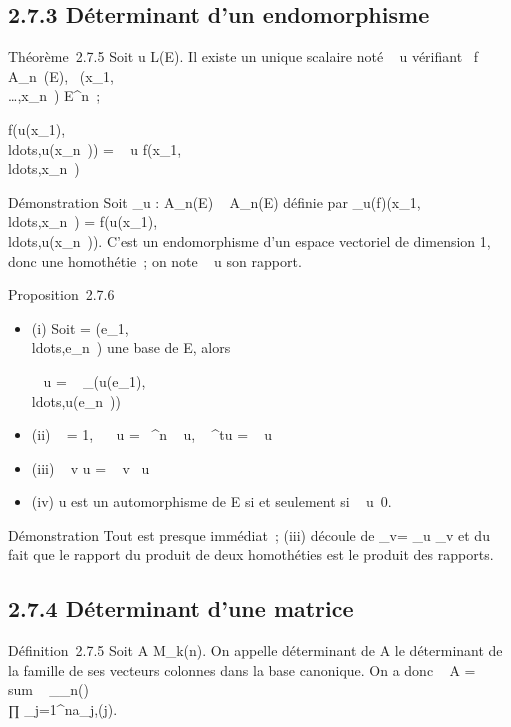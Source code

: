 \documentclass[]{article}
\begin{document}
\subsection{2.7.3 Déterminant d'un endomorphisme}

Théorème~2.7.5 Soit u \in L(E). Il existe un unique scalaire noté
~ u vérifiant
\forall~f \in A_n~(E),
\forall~(x_1,\\\ldots,x_n~)
\in E^n~;

f(u(x_1),\\ldots,u(x_n~))
= ~ u
f(x_1,\\ldots,x_n~)

Démonstration Soit \phi_u : A_n(E) \rightarrow~ A_n(E)
définie par
\phi_u(f)(x_1,\\ldots,x_n~)
=
f(u(x_1),\\ldots,u(x_n~)).
C'est un endomorphisme d'un espace vectoriel de dimension 1, donc une
homothétie~; on note
~ u son rapport.

Proposition~2.7.6

\begin{itemize}
\item
  (i) Soit  =
  (e_1,\\ldots,e_n~)
  une base de E, alors

  ~ u
  = ~
  _(u(e_1),\\ldots,u(e_n~))
\item
  (ii) ~
  \mathrmId = 1,
  ~ \lambda~u =
  \lambda~^n ~
  u, ~
  ^tu = ~
  u
\item
  (iii) ~ v \cdot u
  = ~
  v~ u
\item
  (iv) u est un automorphisme de E si et seulement si
  ~
  u\neq~0.
\end{itemize}

Démonstration Tout est presque immédiat~; (iii) découle de
\phi_v\cdotu = \phi_u \cdot \phi_v et du fait que le rapport
du produit de deux homothéties est le produit des rapports.

\subsection{2.7.4 Déterminant d'une matrice}

Définition~2.7.5 Soit A \in M_k(n). On appelle déterminant de A
le déterminant de la famille de ses vecteurs colonnes dans la base
canonique. On a donc
~ A
= \\sum ~
_\sigma\inS_n\epsilon(\sigma)\\∏
 _j=1^na_j,\sigma(j).
\end{document}
